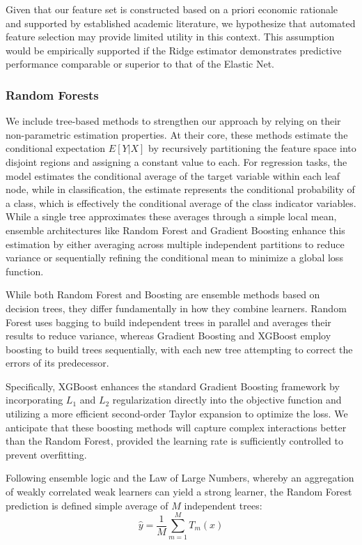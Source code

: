 Given that our feature set is constructed based on a priori economic rationale and supported by established academic literature, we hypothesize that automated feature selection may provide limited utility in this context. This assumption would be empirically supported if the Ridge estimator demonstrates predictive performance comparable or superior to that of the Elastic Net.

\subsubsection{Random Forests}
We include tree-based methods to strengthen our approach by relying on their non-parametric estimation properties. At their core, these methods estimate the conditional expectation $E[Y|X]$ by recursively partitioning the feature space into disjoint regions and assigning a constant value to each. For regression tasks, the model estimates the conditional average of the target variable within each leaf node, while in classification, the estimate represents the conditional probability of a class, which is effectively the conditional average of the class indicator variables. While a single tree approximates these averages through a simple local mean, ensemble architectures like Random Forest and Gradient Boosting enhance this estimation by either averaging across multiple independent partitions to reduce variance or sequentially refining the conditional mean to minimize a global loss function.

While both Random Forest and Boosting are ensemble methods based on decision trees, they differ fundamentally in how they combine learners. Random Forest uses bagging to build independent trees in parallel and averages their results to reduce variance, whereas Gradient Boosting and XGBoost employ boosting to build trees sequentially, with each new tree attempting to correct the errors of its predecessor. 

Specifically, XGBoost enhances the standard Gradient Boosting framework by incorporating $L_1$ and $L_2$ regularization directly into the objective function and utilizing a more efficient second-order Taylor expansion to optimize the loss. We anticipate that these boosting methods will capture complex interactions better than the Random Forest, provided the learning rate is sufficiently controlled to prevent overfitting.


Following ensemble logic and the Law of Large Numbers, whereby an aggregation of weakly correlated weak learners can yield a strong learner, the Random Forest prediction is defined simple average of $M$ independent trees:
\begin{equation}
\hat{y} = \frac{1}{M} \sum_{m=1}^{M} T_m(x)
\end{equation}


